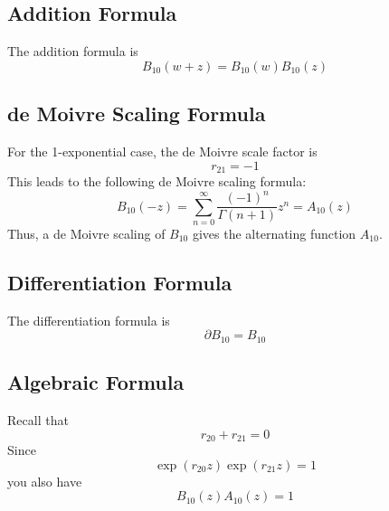 \subsection{Addition Formula}
The addition formula is
\begin{equation}
    B_{10}(w + z) = B_{10}(w) B_{10}(z)
\end{equation}
\subsection{de Moivre Scaling Formula}
For the 1-exponential case, the de Moivre scale factor is
\begin{equation}
    r_{21} = -1
\end{equation}
This leads to the following de Moivre scaling formula:
\begin{equation}
    B_{10}(-z) = \sum_{n = 0}^{\infty} \frac{(-1)^{n}}{\Gamma(n + 1)} z^{n} = A_{10}(z)
\end{equation}
Thus, a de Moivre scaling of $B_{10}$ gives the alternating function $A_{10}$.
\subsection{Differentiation Formula}
The differentiation formula is
\begin{equation}
    \partial B_{10} = B_{10}
\end{equation}
\subsection{Algebraic Formula}
Recall that
\begin{equation}
    r_{20} + r_{21} = 0
\end{equation}
Since
\begin{equation}
    \exp\left(r_{20} z\right) \exp\left(r_{21} z\right) = 1
\end{equation}
you also have
\begin{equation}
    B_{10}(z) A_{10}(z) = 1
\end{equation}